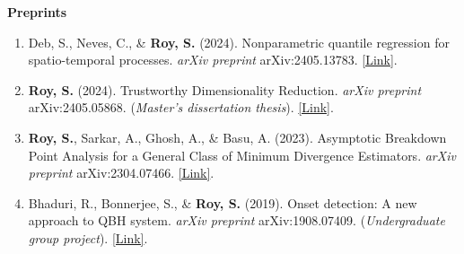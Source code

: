 \documentclass[9pt]{developercv} %
\begin{document}
{    \vspace*{0.3cm}
    \textbf{Preprints}
    \begin{enumerate}
        \item Deb, S., Neves, C., \& \textbf{Roy, S.} (2024). Nonparametric quantile regression for spatio-temporal processes. \emph{arXiv preprint} arXiv:2405.13783. \href{https://arxiv.org/abs/2405.13783}{[Link]}.
        \item \textbf{Roy, S.} (2024). Trustworthy Dimensionality Reduction. \emph{arXiv preprint} arXiv:2405.05868. (\textit{Master's dissertation thesis}). \href{https://arxiv.org/abs/2405.05868}{[Link]}.
        \item \textbf{Roy, S.}, Sarkar, A., Ghosh, A., \& Basu, A. (2023). Asymptotic Breakdown Point Analysis for a General Class of Minimum Divergence Estimators. \emph{arXiv preprint} arXiv:2304.07466. \href{https://arxiv.org/abs/2304.07466}{[Link]}.
        \item Bhaduri, R., Bonnerjee, S., \& \textbf{Roy, S.} (2019). Onset detection: A new approach to QBH system. \emph{arXiv preprint} arXiv:1908.07409. (\textit{Undergraduate group project}). \href{https://arxiv.org/abs/1908.07409}{[Link]}.
    \end{enumerate}
}
\end{document}
